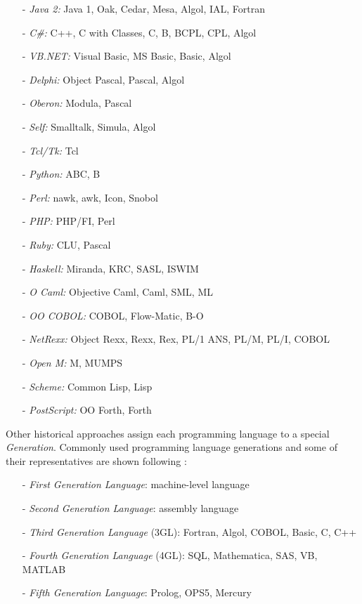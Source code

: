 \begin{itemize}
    \item[-] \emph{Java 2:} Java 1, Oak, Cedar, Mesa, Algol, IAL, Fortran
    \item[-] \emph{C\#:} C++, C with Classes, C, B, BCPL, CPL, Algol
    \item[-] \emph{VB.NET:} Visual Basic, MS Basic, Basic, Algol
    \item[-] \emph{Delphi:} Object Pascal, Pascal, Algol
    \item[-] \emph{Oberon:} Modula, Pascal
    \item[-] \emph{Self:} Smalltalk, Simula, Algol
    \item[-] \emph{Tcl/Tk:} Tcl
    \item[-] \emph{Python:} ABC, B
    \item[-] \emph{Perl:} nawk, awk, Icon, Snobol
    \item[-] \emph{PHP:} PHP/FI, Perl
    \item[-] \emph{Ruby:} CLU, Pascal
    \item[-] \emph{Haskell:} Miranda, KRC, SASL, ISWIM
    \item[-] \emph{O Caml:} Objective Caml, Caml, SML, ML
    \item[-] \emph{OO COBOL:} COBOL, Flow-Matic, B-O
    \item[-] \emph{NetRexx:} Object Rexx, Rexx, Rex, PL/1 ANS, PL/M, PL/I, COBOL
    \item[-] \emph{Open M:} M, MUMPS
    \item[-] \emph{Scheme:} Common Lisp, Lisp
    \item[-] \emph{PostScript:} OO Forth, Forth
\end{itemize}

Other historical approaches assign each programming language to a special
\emph{Generation}. Commonly used programming language generations and some of
their representatives are shown following \cite{wikipedia}:

\begin{itemize}
    \item[-] \emph{First Generation Language}: machine-level language
    \item[-] \emph{Second Generation Language}: assembly language
    \item[-] \emph{Third Generation Language} (3GL): Fortran, Algol, COBOL, Basic, C, C++
    \item[-] \emph{Fourth Generation Language} (4GL): SQL, Mathematica, SAS, VB, MATLAB
    \item[-] \emph{Fifth Generation Language}: Prolog, OPS5, Mercury
\end{itemize}
